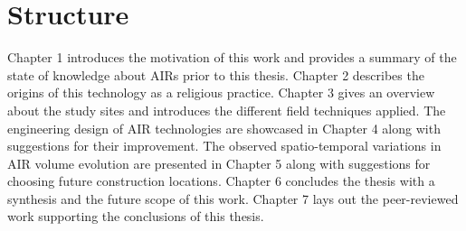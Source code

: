 \section{Structure}

Chapter 1 introduces the motivation of this work and provides a summary of the state of knowledge about \ac{AIRs}
prior to this thesis. Chapter 2 describes the origins of this technology as a religious practice. Chapter 3
gives an overview about the study sites and introduces the different field techniques applied. The engineering
design of AIR technologies are showcased in Chapter 4 along with suggestions for their improvement. The observed
spatio-temporal variations in AIR volume evolution are presented in Chapter 5 along with suggestions for
choosing future construction locations. Chapter 6 concludes the thesis with a synthesis and the future scope of
this work. Chapter 7 lays out the peer-reviewed work supporting the conclusions of this thesis.

